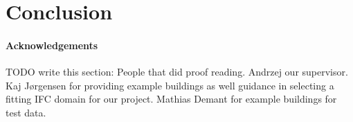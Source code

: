 \section{Conclusion}
\paragraph{Acknowledgements}
TODO write this section: People that did proof reading. Andrzej our supervisor. Kaj Jørgensen for providing example buildings as well guidance in selecting a fitting IFC domain for our project. Mathias Demant for example buildings for test data.